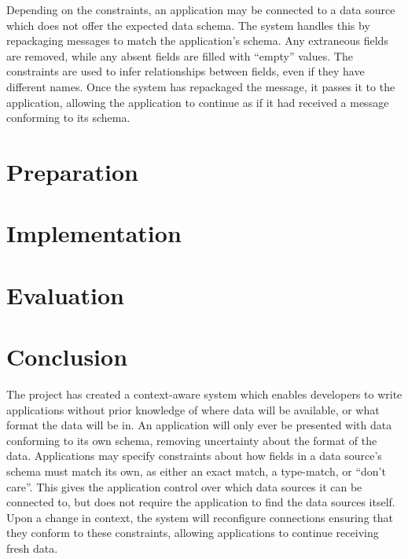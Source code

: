 \documentclass[12pt,twoside,notitlepage]{report}
\begin{document}
Depending on the constraints, an application may be connected to a data source which does not offer the expected data schema. 
The system handles this by repackaging messages to match the application's schema. Any extraneous fields are removed, while any absent fields are filled with ``empty'' values. The constraints are used to infer relationships between fields, even if they have different names. 
Once the system has repackaged the message, it passes it to the application, allowing the application to continue as if it had received a message conforming to its schema.

\cleardoublepage

 
\chapter{Preparation}


\cleardoublepage


\chapter{Implementation}


\cleardoublepage


\chapter{Evaluation}


\cleardoublepage

\chapter{Conclusion}

The project has created a context-aware system which enables developers to write applications without prior knowledge of where data will be available, or what format the data will be in.
An application will only ever be presented with data conforming to its own schema, removing uncertainty about the format of the data. 
Applications may specify constraints about how fields in a data source's schema must match its own, as either an exact match, a type-match, or ``don't care''.
This gives the application control over which data sources it can be connected to, but does not require the application to find the data sources itself. 
Upon a change in context, the system will reconfigure connections ensuring that they conform to these constraints, allowing applications to continue receiving fresh data.
\end{document}
